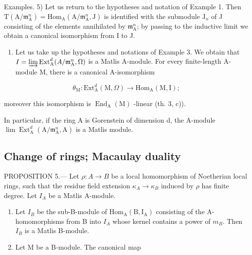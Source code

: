 Examples. 5) Let us return to the hypotheses and notation of Example 1. Then \(\mathrm{T}(\mathrm{A} / \mathfrak{m}_{\mathrm{A}}^{n}) = \mathrm{Hom}_{\mathrm{A}}(\mathrm{A} / \mathfrak{m}_{\mathrm{A}}^{n},\mathrm{J})\) is identified with the submodule \(\mathrm{J}_n\) of J consisting of the elements annihilated by \(\mathfrak{m}_{\mathrm{A}}^{n}\); by passing to the inductive limit we obtain a canonical isomorphism from I to J.

\begin{enumerate}
\def\labelenumi{\arabic{enumi})}
\setcounter{enumi}{5}
\tightlist
\item
  Let us take up the hypotheses and notations of Example 3. We obtain that \(I = \varinjlim \operatorname{Ext}_{\mathrm{A}}^{d}(A / \mathfrak{m}_{\mathrm{A}}^{n}, \Omega)\) is a Matlis A-module. For every finite-length A-module M, there is a canonical A-isomorphism
\end{enumerate}

\[
\theta_ {\mathrm{M}}: \mathrm{Ext} _ {\mathrm{A}} ^ {d} (\mathrm{M}, \Omega) \longrightarrow \mathrm{Hom} _ {\mathrm{A}} (\mathrm{M}, \mathrm{I});
\]

moreover this isomorphism is \(\operatorname{End}_{\mathrm{A}}(\mathrm{M})\) -linear (th. 3, c)).

In particular, if the ring A is Gorenstein of dimension d, the A-module \(\lim\operatorname{Ext}_{\mathrm{A}}^{d}(\mathrm{A}/\mathfrak{m}_{\mathrm{A}}^{n},\mathrm{A})\) is a Matlis module.

\subsection{Change of rings; Macaulay duality}

PROPOSITION 5.--- Let \(\rho: A \to B\) be a local homomorphism of Noetherian local rings, such that the residue field extension \(\kappa_A \to \kappa_B\) induced by \(\rho\) has finite degree. Let \(I_A\) be a Matlis A-module.

\begin{enumerate}
\def\labelenumi{\alph{enumi})}
\item
  Let \(I_{B}\) be the sub-B-module of \(\mathrm{Hom}_{\mathrm{A}}(\mathrm{B},\mathrm{I}_{\mathrm{A}})\) consisting of the A-homomorphisms from B into \(I_{A}\) whose kernel contains a power of \(m_{B}\). Then \(I_{B}\) is a Matlis B-module.
\item
  Let M be a B-module. The canonical map
\end{enumerate}

